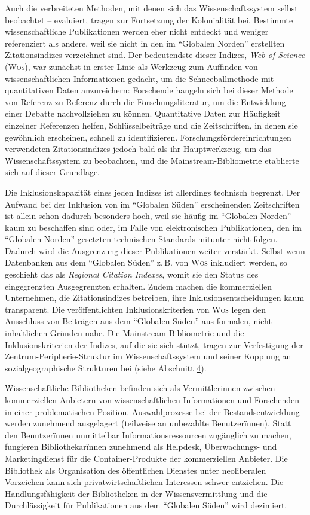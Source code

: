 \documentclass[a4paper,
fontsize=11pt,
oneside,
numbers=noperiodatend,
parskip=half-,
bibliography=totoc,
final
]{scrartcl}
\begin{document}
Auch die verbreiteten Methoden, mit denen sich das Wissenschaftssystem
selbst beobachtet -- evaluiert, tragen zur Fortsetzung der Kolonialität
bei. Bestimmte wissenschaftliche Publikationen werden eher nicht
entdeckt und weniger referenziert als andere, weil sie nicht in den im
\enquote{Globalen Norden} erstellten Zitationsindizes verzeichnet sind.
Der bedeutendste dieser Indizes, \emph{Web of Science} (\textsc{Wos}),
war zunächst in erster Linie als Werkzeug zum Auffinden von
wissenschaftlichen Informationen gedacht, um die Schneeballmethode mit
quantitativen Daten anzureichern: Forschende hangeln sich bei dieser
Methode von Referenz zu Referenz durch die Forschungsliteratur, um die
Entwicklung einer Debatte nachvollziehen zu können. Quantitative Daten
zur Häufigkeit einzelner Referenzen helfen, Schlüsselbeiträge und die
Zeitschriften, in denen sie gewöhnlich erscheinen, schnell zu
identifizieren. Forschungsfördereinrichtungen verwendeten
Zitationsindizes jedoch bald als ihr Hauptwerkzeug, um das
Wissenschaftssystem zu beobachten, und die Mainstream-Bibliometrie
etablierte sich auf dieser Grundlage.

Die Inklusionskapazität eines jeden Indizes ist allerdings technisch
begrenzt. Der Aufwand bei der Inklusion von im \enquote{Globalen Süden}
erscheinenden Zeitschriften ist allein schon dadurch besonders hoch,
weil sie häufig im \enquote{Globalen Norden} kaum zu beschaffen sind
oder, im Falle von elektronischen Publikationen, den im
\enquote{Globalen Norden} gesetzten technischen Standards mitunter nicht
folgen. Dadurch wird die Ausgrenzung dieser Publikationen weiter
verstärkt. Selbst wenn Datenbanken aus dem \enquote{Globalen Süden}
z. B. von \textsc{Wos} inkludiert werden, so geschieht das als
\emph{Regional Citation Indexes}, womit sie den Status des eingegrenzten
Ausgegrenzten erhalten. Zudem machen die kommerziellen Unternehmen, die
Zitationsindizes betreiben, ihre Inklusionsentscheidungen kaum
transparent. Die veröffentlichten Inklusionskriterien von \textsc{Wos}
legen den Ausschluss von Beiträgen aus dem \enquote{Globalen Süden} aus
formalen, nicht inhaltlichen Gründen nahe. Die Mainstream-Bibliometrie
und die Inklusionskriterien der Indizes, auf die sie sich stützt, tragen
zur Verfestigung der Zentrum-Peripherie-Struktur im Wissenschaftssystem
und seiner Kopplung an sozialgeographische Strukturen bei (siehe
Abschnitt \protect\hyperlink{peripherie}{4}).

Wissenschaftliche Bibliotheken befinden sich als Vermittlerinnen
zwischen kommerziellen Anbietern von wissenschaftlichen Informationen
und Forschenden in einer problematischen Position. Auswahlprozesse bei
der Bestandsentwicklung werden zunehmend ausgelagert (teilweise an
unbezahlte Benutzerïnnen). Statt den Benutzerïnnen unmittelbar
Informationsressourcen zugänglich zu machen, fungieren Bibliothekarïnnen
zunehmend als Helpdesk, Überwachungs- und Marketingdienst für die
Container-Produkte der kommerziellen Anbieter. Die Bibliothek als
Organisation des öffentlichen Dienstes unter neoliberalen Vorzeichen
kann sich privatwirtschaftlichen Interessen schwer entziehen. Die
Handlungsfähigkeit der Bibliotheken in der Wissensvermittlung und die
Durchlässigkeit für Publikationen aus dem \enquote{Globalen Süden} wird
dezimiert.
\end{document}
